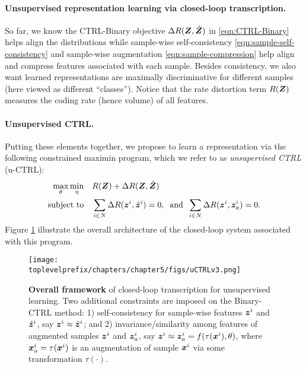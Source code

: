 \documentclass[\toplevelprefix/book-main.tex]{subfiles}
\begin{document}
\paragraph{Unsupervised representation learning via closed-loop transcription.} 
So far, we know the CTRL-Binary objective $\Delta R(\bm{Z}, \hat{\bm{Z}})$ in \eqref{eqn:CTRL-Binary} helps align the distributions while sample-wise self-consistency \eqref{eqn:sample-self-consistency} and sample-wise augmentation \eqref{eqn:sample-compression} help align and compress features associated with each sample. Besides consistency, we also want learned representations are maximally discriminative for different samples (here viewed as different ``classes''). Notice that the rate distortion term $R(\bm{Z})$ measures the coding rate (hence volume) of all features. %

\paragraph{Unsupervised CTRL.} Putting these elements together, we propose to learn a representation via the following constrained maximin program, which we refer to as {\em unsupervised CTRL} (u-CTRL):
\begin{align}
      \max_\theta \min_\eta  \quad & R(\bm{Z}) + \Delta R(\bm{Z}, \hat{\bm{Z}}) \label{eqn:constrained_maxmin}\\
 \mbox{subject to} \quad & \sum_{i\in N} \Delta R(\bm{z}^i, \hat{\bm{z}}^i) = 0, \;\; \mbox{and} \;\; \sum_{i\in N} \Delta R(\bm{z}^i, \bm{z}_{a}^i) = 0. \nonumber
\end{align}
Figure \ref{fig:framework-uCTRL} illustrate the overall architecture of the closed-loop system associated with this program.
\begin{figure}[t]
\centering
\texttt{[image: \\toplevelprefix/chapters/chapter5/figs/uCTRLv3.png]}
\caption{\textbf{Overall framework} of closed-loop transcription for unsupervised learning. Two additional constraints are imposed on the Binary-CTRL method: 1) self-consistency for sample-wise features $\bm{z}^i$ and $\hat{\bm{z}}^i$, say $\bm{z}^i \approx \hat{\bm{z}}^i$; and 2) invariance/similarity among features of augmented samples $\bm{z}^i$ and $\bm{z}_{a}^i$, say $\bm{z}^i \approx \bm{z}_{a}^i=f(\tau(\bm{x}^i), \theta)$, where $\bm{x}^i_a=\tau(\bm{x}^i)$ is an augmentation of sample $\bm{x}^i$ via some transformation $\tau(\cdot)$.}
\label{fig:framework-uCTRL}
\end{figure}
\end{document}
